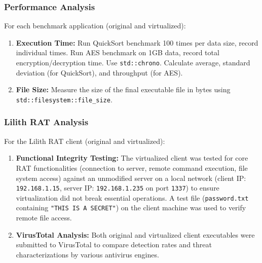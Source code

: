 \subsubsection{Performance Analysis}
For each benchmark application (original and virtualized):
    \begin{enumerate}
        \item \textbf{Execution Time:} Run QuickSort benchmark 100 times per data size, record individual times. Run AES benchmark on 1GB data, record total encryption/decryption time. Use \texttt{std::chrono}. Calculate average, standard deviation (for QuickSort), and throughput (for AES).
        \item \textbf{File Size:} Measure the size of the final executable file in bytes using \texttt{std::filesystem::file\_size}.
    \end{enumerate}

\subsubsection{Lilith RAT Analysis}
\label{subsubsec:methodology_lilith_rat_journal} 
For the Lilith RAT client (original and virtualized):
\begin{enumerate}
    \item \textbf{Functional Integrity Testing:} The virtualized client was tested for core RAT functionalities (connection to server, remote command execution, file system access) against an unmodified server on a local network (client IP: \texttt{192.168.1.15}, server IP: \texttt{192.168.1.235} on port \texttt{1337}) to ensure virtualization did not break essential operations. A test file (\texttt{password.txt} containing \texttt{"THIS IS A SECRET"}) on the client machine was used to verify remote file access.
    \item \textbf{VirusTotal Analysis:} Both original and virtualized client executables were submitted to VirusTotal to compare detection rates and threat characterizations by various antivirus engines.
\end{enumerate}

